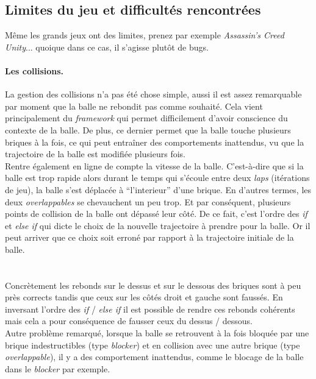 \documentclass[a4paper,10pt]{article}
\begin{document}
\subsection{Limites du jeu et difficultés rencontrées}


Même les grands jeux ont des limites, prenez par exemple \textit{Assassin's Creed Unity}... quoique dans ce cas,
il s'agisse plutôt de bugs.

\paragraph{Les collisions.}
La gestion des collisions n'a pas été chose simple, aussi il est assez remarquable par moment que la balle
ne rebondit pas comme souhaité. Cela vient principalement du \textit{framework} qui permet difficilement d'avoir
conscience du contexte de la balle. De plus, ce dernier permet que la balle touche plusieurs briques à la fois,
ce qui peut entraîner des comportements inattendus, vu que la trajectoire de la balle est modifiée plusieurs fois. \\

Rentre également en ligne de compte la vitesse de la balle. C'est-à-dire que si la balle est trop rapide alors durant
le temps qui s'écoule entre deux \textit{laps} (itérations de jeu), la balle s'est déplacée à ``l'interieur'' d'une brique.
En d'autres termes, les
deux \textit{overlappables} se chevauchent un peu trop. Et par conséquent, plusieurs
points de collision de la balle ont dépassé leur côté. De ce fait, c'est l'ordre des \textit{if} et \textit{else if} qui dicte
le choix de la nouvelle trajectoire à prendre pour la balle. Or il peut arriver que ce choix soit erroné par rapport à la
trajectoire initiale de la balle.\\ \\ \\
Concrètement les rebonds sur le dessus et sur le dessous des briques sont à peu près corrects tandis que ceux sur
les côtés droit et gauche sont faussés. En inversant l'ordre des \textit{if} / \textit{else if} il est possible de rendre
ces rebonds cohérents mais cela a pour conséquence de fausser ceux du dessus / dessous. \\

Autre problème remarqué, lorsque la balle se retrouvent à la fois bloquée par une brique indestructibles (type \textit{blocker})
et en collision avec une autre brique (type \textit{overlappable}), il y a des comportement inattendus, comme le blocage
de la balle dans le \textit{blocker} par exemple.
\end{document}
